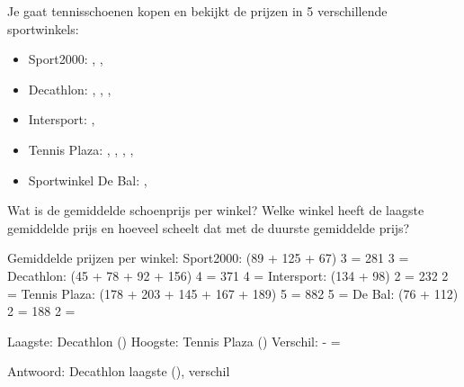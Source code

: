 \begin{opgave}
Je gaat tennisschoenen kopen en bekijkt de prijzen in 5 verschillende sportwinkels:

\begin{itemize}
\item Sport2000: , , 
\item Decathlon: , , , 
\item Intersport: , 
\item Tennis Plaza: , , , , 
\item Sportwinkel De Bal: , 
\end{itemize}

Wat is de gemiddelde schoenprijs per winkel? Welke winkel heeft de laagste
gemiddelde prijs en hoeveel scheelt dat met de duurste gemiddelde prijs?
\end{opgave}

\begin{oplossing}
Gemiddelde prijzen per winkel:
Sport2000: (89 + 125 + 67) \textrm{\textdiv} 3 = 281 \textrm{\textdiv} 3 = 
Decathlon: (45 + 78 + 92 + 156) \textrm{\textdiv} 4 = 371 \textrm{\textdiv} 4 = 
Intersport: (134 + 98) \textrm{\textdiv} 2 = 232 \textrm{\textdiv} 2 = 
Tennis Plaza: (178 + 203 + 145 + 167 + 189) \textrm{\textdiv} 5 = 882 \textrm{\textdiv} 5 = 
De Bal: (76 + 112) \textrm{\textdiv} 2 = 188 \textrm{\textdiv} 2 = 

Laagste: Decathlon ()
Hoogste: Tennis Plaza ()
Verschil:  -  = 

Antwoord: Decathlon laagste (), verschil 
\end{oplossing}